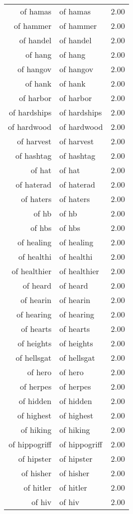 \begin{table}[ht]
\begin{tabular}{rlr}
  of hamas & of hamas & 2.00 \\ 
  of hammer & of hammer & 2.00 \\ 
  of handel & of handel & 2.00 \\ 
  of hang & of hang & 2.00 \\ 
  of hangov & of hangov & 2.00 \\ 
  of hank & of hank & 2.00 \\ 
  of harbor & of harbor & 2.00 \\ 
  of hardships & of hardships & 2.00 \\ 
  of hardwood & of hardwood & 2.00 \\ 
  of harvest & of harvest & 2.00 \\ 
  of hashtag & of hashtag & 2.00 \\ 
  of hat & of hat & 2.00 \\ 
  of haterad & of haterad & 2.00 \\ 
  of haters & of haters & 2.00 \\ 
  of hb & of hb & 2.00 \\ 
  of hbs & of hbs & 2.00 \\ 
  of healing & of healing & 2.00 \\ 
  of healthi & of healthi & 2.00 \\ 
  of healthier & of healthier & 2.00 \\ 
  of heard & of heard & 2.00 \\ 
  of hearin & of hearin & 2.00 \\ 
  of hearing & of hearing & 2.00 \\ 
  of hearts & of hearts & 2.00 \\ 
  of heights & of heights & 2.00 \\ 
  of hellsgat & of hellsgat & 2.00 \\ 
  of hero & of hero & 2.00 \\ 
  of herpes & of herpes & 2.00 \\ 
  of hidden & of hidden & 2.00 \\ 
  of highest & of highest & 2.00 \\ 
  of hiking & of hiking & 2.00 \\ 
  of hippogriff & of hippogriff & 2.00 \\ 
  of hipster & of hipster & 2.00 \\ 
  of hisher & of hisher & 2.00 \\ 
  of hitler & of hitler & 2.00 \\ 
  of hiv & of hiv & 2.00 \\ 

\end{tabular}
\end{table}
